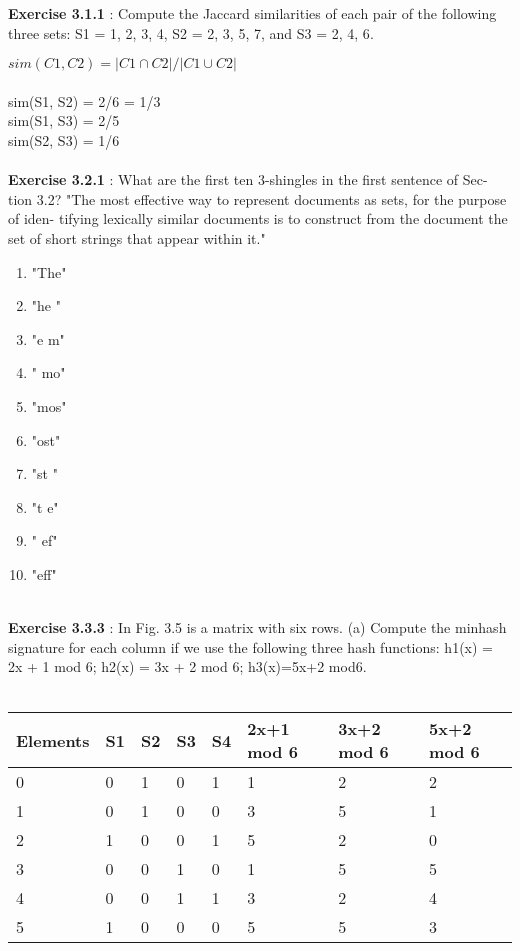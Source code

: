 \documentclass{exam}
\begin{document}
\begin{questions}
\question \textbf{Exercise 3.1.1} : Compute the Jaccard similarities of each pair of the following three sets: S1 = {1, 2, 3, 4}, S2 =  {2, 3, 5, 7}, and S3 = {2, 4, 6}.

$sim(C1, C2) = |C1 \cap C2|/|C1 \cup C2|$ \\\\
sim(S1, S2) = 2/6 = 1/3\\
sim(S1, S3) = 2/5\\
sim(S2, S3) =  1/6\\\\

\question \textbf{Exercise 3.2.1} : What are the first ten 3-shingles in the first sentence of Sec- tion 3.2?
"The most effective way to represent documents as sets, for the purpose of iden- tifying lexically similar documents is to construct from the document the set of short strings that appear within it."
\begin{enumerate}
\item "The"
\item "he "
\item "e m"
\item " mo"
\item "mos"
\item "ost"
\item "st "
\item "t e"
\item " ef"
\item "eff" \\\\
\end{enumerate}

\question \textbf{Exercise 3.3.3} : In Fig. 3.5 is a matrix with six rows.
(a) Compute the minhash signature for each column if we use the following three hash functions: h1(x) = 2x + 1 mod 6; h2(x) = 3x + 2 mod 6; h3(x)=5x+2 mod6.\\\\

\begin{center}
    \begin{tabular}{| l | l | l | l | l | l | l | l |}
    \hline
    Elements & S1 & S2 & S3 & S4 & 2x+1 mod 6 & 3x+2 mod 6 & 5x+2 mod 6 \\ \hline
     0 & 0 & 1 & 0 & 1 & 1 & 2 & 2\\ \hline
     1 & 0 & 1 & 0 & 0 & 3 & 5 & 1\\ \hline
     2 & 1 & 0 & 0 & 1 & 5 & 2 & 0\\ \hline
     3 & 0 & 0 & 1 & 0 & 1 & 5 & 5\\ \hline
     4 & 0 & 0 & 1 & 1 & 3 & 2 & 4\\ \hline
   	 5 & 1 & 0 & 0 & 0 & 5 & 5 & 3\\ \hline
    \end{tabular}
\end{center}


\end{questions}
\end{document}
